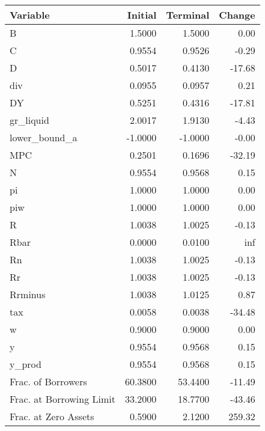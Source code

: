 \begin{table}
\centering
\label{tab:stst_labour}
\begin{tabular}{lrrr}
\toprule
                Variable &  Initial &  Terminal &  Change \\
\midrule
                       B &   1.5000 &    1.5000 &    0.00 \\
                       C &   0.9554 &    0.9526 &   -0.29 \\
                       D &   0.5017 &    0.4130 &  -17.68 \\
                     div &   0.0955 &    0.0957 &    0.21 \\
                      DY &   0.5251 &    0.4316 &  -17.81 \\
               gr\_liquid &   2.0017 &    1.9130 &   -4.43 \\
           lower\_bound\_a &  -1.0000 &   -1.0000 &   -0.00 \\
                     MPC &   0.2501 &    0.1696 &  -32.19 \\
                       N &   0.9554 &    0.9568 &    0.15 \\
                      pi &   1.0000 &    1.0000 &    0.00 \\
                     piw &   1.0000 &    1.0000 &    0.00 \\
                       R &   1.0038 &    1.0025 &   -0.13 \\
                    Rbar &   0.0000 &    0.0100 &     inf \\
                      Rn &   1.0038 &    1.0025 &   -0.13 \\
                      Rr &   1.0038 &    1.0025 &   -0.13 \\
                 Rrminus &   1.0038 &    1.0125 &    0.87 \\
                     tax &   0.0058 &    0.0038 &  -34.48 \\
                       w &   0.9000 &    0.9000 &    0.00 \\
                       y &   0.9554 &    0.9568 &    0.15 \\
                  y\_prod &   0.9554 &    0.9568 &    0.15 \\
      Frac. of Borrowers &  60.3800 &   53.4400 &  -11.49 \\
Frac. at Borrowing Limit &  33.2000 &   18.7700 &  -43.46 \\
    Frac. at Zero Assets &   0.5900 &    2.1200 &  259.32 \\
\bottomrule
\end{tabular}
\end{table}
